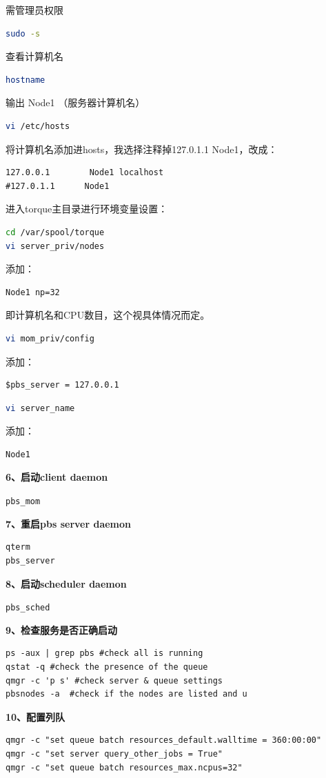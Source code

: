 {需管理员权限
\begin{lstlisting}[language=sh]
sudo -s
\end{lstlisting}
查看计算机名
\begin{lstlisting}[language=sh]
hostname
\end{lstlisting}
输出 Node1 （服务器计算机名）
\begin{lstlisting}[language=sh]
vi /etc/hosts
\end{lstlisting}
 将计算机名添加进hosts，我选择注释掉127.0.1.1 Node1，改成：
 \begin{verbatim}
127.0.0.1        Node1 localhost
#127.0.1.1      Node1
\end{verbatim}
进入torque主目录进行环境变量设置：
\begin{lstlisting}[language=sh]
cd /var/spool/torque
vi server_priv/nodes
\end{lstlisting}
添加：
 \begin{verbatim}
Node1 np=32
\end{verbatim}
即计算机名和CPU数目，这个视具体情况而定。
\begin{lstlisting}[language=sh]
vi mom_priv/config
\end{lstlisting}
添加：
\begin{verbatim}
$pbs_server = 127.0.0.1
\end{verbatim}
\begin{lstlisting}[language=sh]
vi server_name
\end{lstlisting}
添加：
\begin{verbatim}
Node1
\end{verbatim}


\textbf{6、启动client daemon}

\verb|pbs_mom|

\textbf{7、重启pbs server daemon}
\begin{verbatim}
qterm
pbs_server
\end{verbatim}

\textbf{8、启动scheduler daemon}

\verb|pbs_sched|

\textbf{9、检查服务是否正确启动}
\begin{verbatim}
ps -aux | grep pbs #check all is running
qstat -q #check the presence of the queue
qmgr -c 'p s' #check server & queue settings
pbsnodes -a  #check if the nodes are listed and u
\end{verbatim}

\textbf{10、配置列队}
\begin{verbatim}
qmgr -c "set queue batch resources_default.walltime = 360:00:00"
qmgr -c "set server query_other_jobs = True"
qmgr -c "set queue batch resources_max.ncpus=32"
\end{verbatim}

}
